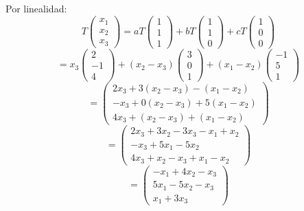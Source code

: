 \begin{prob}
\begin{myproof}
Por linealidad:
\[
T\begin{pmatrix} x_1 \\ x_2 \\ x_3 \end{pmatrix} = a T\begin{pmatrix} 1 \\ 1 \\ 1 \end{pmatrix} + b T\begin{pmatrix} 1 \\ 1 \\ 0 \end{pmatrix} + c T\begin{pmatrix} 1 \\ 0 \\ 0 \end{pmatrix}
\]
\[
= x_3 \begin{pmatrix} 2 \\ -1 \\ 4 \end{pmatrix} + (x_2 - x_3) \begin{pmatrix} 3 \\ 0 \\ 1 \end{pmatrix} + (x_1 - x_2) \begin{pmatrix} -1 \\ 5 \\ 1 \end{pmatrix}
\]
\[
= \begin{pmatrix}
2x_3 + 3(x_2 - x_3) - (x_1 - x_2) \\
- x_3 + 0(x_2 - x_3) + 5(x_1 - x_2) \\
4x_3 + (x_2 - x_3) + (x_1 - x_2)
\end{pmatrix}
\]
\[
= \begin{pmatrix}
2x_3 + 3x_2 - 3x_3 - x_1 + x_2 \\
- x_3 + 5x_1 - 5x_2 \\
4x_3 + x_2 - x_3 + x_1 - x_2
\end{pmatrix}
\]
\[
= \begin{pmatrix}
- x_1 + 4x_2 - x_3 \\
5x_1 - 5x_2 - x_3 \\
x_1 + 3x_3
\end{pmatrix}
\]


\end{myproof}
\end{prob}

